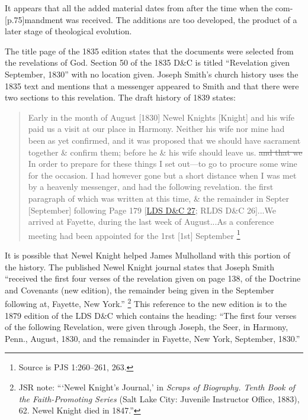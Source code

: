 		It appears that all the added material dates from after the time when the com-[p.75]mandment was received. The additions are too developed, the product of a later stage of theological evolution.

		The title page of the 1835 edition states that the documents were selected from the revelations of God. Section 50 of the 1835 D\&C is titled ``Revelation given September, 1830'' with no location given. Joseph Smith's church history uses the 1835 text and mentions that a messenger appeared to Smith and that there were two sections to this revelation. The draft history of 1839 states:

		\begin{quote}
			Early in the month of August [1830] Newel Knights [Knight] and his wife paid us a visit at our place in Harmony. Neither his wife nor mine had been as yet confirmed, and it was proposed that we should have sacrament together \& confirm them; before he \& his wife should leave us. \sout{and that we} In order to prepare for these things I set out---to go to procure some wine for the occasion. I had however gone but a short distance when I was met by a heavenly messenger, and had the following revelation. the first paragraph of which was written at this time, \& the remainder in Septer [September] following Page 179 [\hyperref[DC27]{LDS D\&C 27}; RLDS D\&C 26]...We arrived at Fayette, during the last week of August...As a conference meeting had been appointed for the 1rst [1st] September%
				\footnote{%
					Source is PJS 1:260--261, 263.
					}
		\end{quote}

		It is possible that Newel Knight helped James Mulholland with this portion of the history. The published Newel Knight journal states that Joseph Smith ``received the first four verses of the revelation given on page 138, of the Doctrine and Covenants (new edition), the remainder being given in the September following at, Fayette, New York.''%
			\footnote{%
				JSR note: ```Newel Knight's Journal,' in \textit{Scraps of Biography. Tenth Book of the Faith-Promoting Series} (Salt Lake City: Juvenile Instructor Office, 1883), 62. Newel Knight died in 1847.''
				}
		This reference to the new edition is to the 1879 edition of the LDS D\&C which contains the heading: ``The first four verses of the following Revelation, were given through Joseph, the Seer, in Harmony, Penn., August, 1830, and the remainder in Fayette, New York, September, 1830.''

